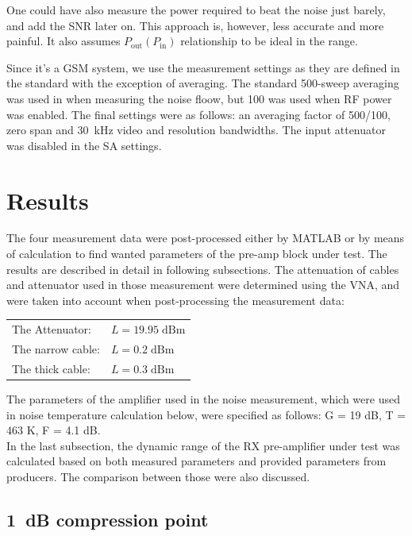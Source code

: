 \documentclass[a4paper, 12pt]{article}
\begin{document}
One could have also measure the power required to beat the noise just barely, and 
add the SNR later on. This approach is, however, less accurate and more painful. It 
also assumes $P_\mathrm{out}(P_\mathrm{in})$ relationship to be ideal in the range.

Since it's a GSM system, we use the measurement settings as they are defined in 
the standard with the exception of averaging. The standard 500-sweep averaging was 
used in when measuring the noise floow, but 100 was used when RF power was enabled. 
The final settings were as follows: an averaging factor of 500/100, zero span and 
30~kHz video and resolution bandwidths. The input attenuator was disabled in the 
SA settings.


\newpage
\section{Results}

The four measurement data were post-processed either by MATLAB or by means of calculation to find wanted parameters of the pre-amp block under test. The results are described in detail in following subsections. The attenuation of cables and attenuator used in those measurement were determined using the VNA, and were taken into account when post-processing the measurement data: 
\begin{table}[!h]

	\renewcommand*{\arraystretch}{1.2}
	\begin{tabular}{ll}
	The Attenuator:				& $L=19.95\mathrm{\;dBm}$ 	\\
	The narrow cable:			& $L=0.2\mathrm{\;dBm}$ 	\\
	The thick cable:				& $L=0.3\mathrm{\;dBm}$ 	
	\end{tabular}

	\vspace*{-12pt}
\end{table}

The parameters of the amplifier used in the noise measurement, which were used in noise temperature calculation below, were specified as follows: G = 19 dB, T = 463 K, F = 4.1 dB.
\\

In the last subsection, the dynamic range of the RX pre-amplifier under test was calculated based on both measured parameters and provided parameters from producers. The comparison between those were also discussed.


\subsection{1~dB compression point}
\end{document}
